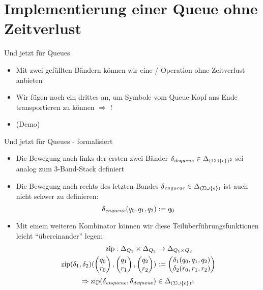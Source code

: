 \documentclass{beamer}
\DeclareMathOperator{\zip}{zip}
\begin{document}
\section{Implementierung einer Queue ohne Zeitverlust}

\begin{frame}{Und jetzt für Queues}
    \begin{itemize}
        \item Mit zwei gefüllten Bändern können wir eine \pop/\dequeue-Operation ohne Zeitverlust anbieten
        \item Wir fügen noch ein drittes an, um Symbole vom Queue-Kopf ans Ende transportieren zu können $\Rightarrow$ \enqueue!
            \begin{center}
            \end{center}
        \item (Demo)
    \end{itemize}
\end{frame}

\begin{frame}{Und jetzt für Queues - formalisiert}
    \begin{itemize}
        \item Die Bewegung nach links der ersten zwei Bänder $\delta_{\mathit{dequeue}} \in \Delta_{(\Sigma \cup \{\epsilon\})^2}$ sei analog zum 3-Band-Stack definiert
        \item Die Bewegung nach rechts des letzten Bandes $\delta_{\mathit{enqueue}} \in \Delta_{(\Sigma \cup \{\epsilon\})}$ ist auch nicht schwer zu definieren:
            \[ \delta_{\mathit{enqueue}}(q_0,q_1,q_2) := q_0 \]
        \item Mit einem weiteren Kombinator können wir diese Teilüberführungsfunktionen leicht "`übereinander"' legen:
            \begin{align*}
                \zip : \Delta_{Q_1} \times \Delta_{Q_2} &\rightarrow \Delta_{Q_1 \times Q_2} \\
                \zip(\delta_1, \delta_2)(\vet{q_0}{r_0},\vet{q_1}{r_1},\vet{q_2}{r_2}) &:= \vet{\delta_1(q_0,q_1,q_2)}{\delta_2(r_0,r_1,r_2)}
            \end{align*}
            \vspace{0.1cm}
            \[ \Rightarrow \zip(\delta_\enqueue,\delta_\dequeue) \in \Delta_{(\Sigma \cup \{\epsilon\})^3} \]
    \end{itemize}
\end{frame}
\end{document}
